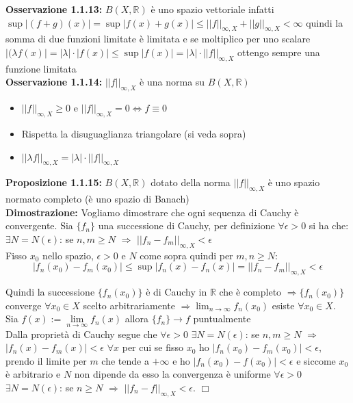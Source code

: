 \documentclass[a4paper,11pt,titlepage]{book}
\begin{document}
\textbf{Osservazione 1.1.13:} $B(X,\mathbb{R})$ è uno spazio vettoriale infatti $\sup |(f+g)(x)|=\sup |f(x)+g(x)|\leq ||f||_{\infty,X}+||g||_{\infty,X}<\infty$ quindi la somma di due funzioni limitate è limitata e se moltiplico per uno scalare $|(\lambda f(x)|=|\lambda |\cdot |f(x)|\leq \sup |f(x)|=|\lambda | \cdot ||f||_{\infty,X}$ ottengo sempre una funzione limitata\\

\textbf{Osservazione 1.1.14:} $||f||_{\infty,X}$ è una norma su $B(X,\mathbb{R})$
\begin{itemize}
\item $||f||_{\infty,X}\geq 0$ e $||f||_{\infty,X}=0\Leftrightarrow f\equiv 0$
\item Rispetta la disuguaglianza triangolare (si veda sopra)
\item $||\lambda f||_{\infty,X}=|\lambda |\cdot ||f||_{\infty,X}$ \\
\end{itemize}

\textbf{Proposizione 1.1.15:} $B(X,\mathbb{R})$ dotato della norma $||f||_{\infty,X}$ è uno spazio normato completo (è uno spazio di Banach) \\

\textbf{Dimostrazione:} Vogliamo dimostrare che ogni sequenza di Cauchy è convergente. Sia $\{f_{n}\}$ una successione di Cauchy, per definizione $\forall{\epsilon}>0$ si ha che: $\exists{N}=N(\epsilon)$: se $n,m\geq{N}$ $\Rightarrow$ $||f_{n}-f_{m}||_{\infty,X}<\epsilon$\\

Fisso $x_0$ nello spazio, $\epsilon >0$ e $ N $ come sopra quindi per $m,n \geq N$:  
$$|f_{n}(x_0)-f_{m}(x_0)|\leq \sup|f_{n}(x)-f_{n}(x)|=||f_{n}-f_{m}||_{\infty,X}<\epsilon$$ 

Quindi la successione $\{f_{n}(x_0)\}$ è di Cauchy in $\mathbb{R}$ che è completo $\Rightarrow\{f_{n}(x_0)\}$  converge $\forall{x_{0}}\in{X}$ scelto arbitrariamente  $\Rightarrow \lim_{n \to \infty}f_{n}(x_0)$ esiste $\forall{x_{0}}\in{X}$. Sia $f(x):=\lim\limits_{n \to \infty}{f_{n}}(x)$ allora $\{f_{n}\}\rightarrow f$ puntualmente\\

Dalla proprietà di Cauchy segue che $\forall{\epsilon}>0$ $\exists{N}=N(\epsilon)$: se $n,m\geq{N}$ $\Rightarrow$ $|f_{n}(x)-f_{m}(x)|<\epsilon$  $\forall{x}$ per cui se fisso $x_0$ ho $|f_{n}(x_0)-f_{m}(x_0)|<\epsilon$, prendo il limite per $m$ che tende a $+\infty$ e ho $|f_{n}(x_0)-f(x_0)|<\epsilon$ e siccome $x_0$ è arbitrario e $N$ non dipende da esso la convergenza è uniforme $\forall{\epsilon{>0}}$ $\exists{N}=N(\epsilon)$: se $n\geq{N}$ $\Rightarrow$ $||f_{n}-f||_{\infty,X}<\epsilon$. $\Box$\\
\end{document}
